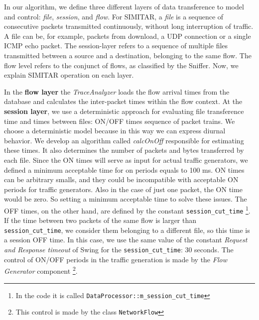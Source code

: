 In our algorithm, we define three different layers of data transference to model and control: \textit{file}, \textit{session}, and \textit{flow}. For SIMITAR, a \textit{file} is a sequence of consecutive packets transmitted continuously, without long interruption of traffic. A file can be, for example, packets from download, a UDP   connection or a single ICMP echo packet. The session-layer refers to a sequence of multiple files transmitted between a source and a destination, belonging to the same flow.  The flow level refers to the conjunct of flows, as classified by the Sniffer.  Now, we explain SIMITAR operation on each layer. 


In the \textbf{flow layer} the \textit{TraceAnalyzer} loads the flow arrival times from the database and calculates the inter-packet times within the flow context. At the \textbf{session layer}, we use a deterministic approach for evaluating file transference time and times between files: ON/OFF times sequence of packet trains. We choose a deterministic model because in this way we can express diurnal behavior\cite{harpoon-paper}.  We develop an algorithm called \textit{calcOnOff} responsible for estimating these times. It also determines the number of packets and bytes transferred by each file. Since the ON times will serve as input for actual traffic generators, we defined a minimum acceptable time for on periods equals to 100 ms. ON times can be arbitrary smalls, and they could be incompatible with acceptable ON periods for traffic generators. Also in the case of just one packet, the ON time would be zero. So setting a minimum acceptable time to solve these issues. The OFF times, on the other hand, are defined by the constant \texttt{session\_cut\_time} \footnote{In the code it is called \texttt{DataProcessor::m\_session\_cut\_time} }. If the time between two packets of the same flow is larger than \texttt{session\_cut\_time}, we consider them belonging to a different file, so this time is a session OFF time. In this case, we use the same value of the constant \textit{Request and Response timeout} of Swing\cite{swing-paper} for the \texttt{session\_cut\_time}: 30 seconds. The control of ON/OFF periods in the traffic generation is made by the \textit{Flow Generator} component \footnote{This control is made by the class \texttt{NetworkFlow}}.


